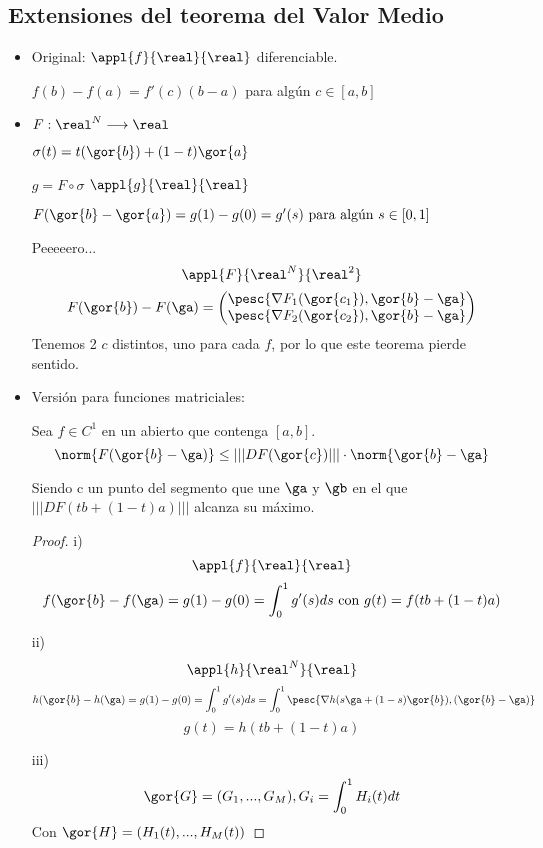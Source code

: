 \subsection{Extensiones del teorema del Valor Medio}
\begin{itemize}
 \item Original:
 $\appl{f}{\real}{\real}$ diferenciable. 
 
 $f(b)-f(a) = f'(c)(b-a)$ para algún $c\in[a,b]$
 
 \item
  
 $F : \real^N  \longrightarrow \real$
 
 $\sigma(t)  = t(\gor{b})+(1-t)\gor{a}$
 
 $g  = F\circ \sigma$
 $\appl{g}{\real }{\real}$
 
 $F(\gor{b}-\gor{a}) = g(1)-g(0)  = g'(s) \text{ para algún }s\in[0,1]$
 
  
  Peeeeero...
  $$\appl{F}{\real^N}{\real^2}$$
  $$F(\gor{b})-F(\ga) = \begin{pmatrix}
                         \pesc{\nabla F_1(\gor{c_1}),{\gor{b}-\ga}}\\
                         \pesc{\nabla F_2(\gor{c_2}),\gor{b}-\ga}
                        \end{pmatrix}
$$
  Tenemos 2 $c$ distintos, uno para cada $f$, por lo que este teorema pierde sentido.
  
  \item Versión para funciones matriciales:
  
  \begin{theorem} 
  Sea $f \in C^1$ en un abierto que contenga $[a,b]$.
  $$\norm{F(\gor{b}-\ga)} \leq |||DF(\gor{c})|||\cdot\norm{\gor{b}-\ga}$$ 
  
  Siendo c un punto del segmento que une $\ga$ y $\gb$ en el que $|||DF(tb+(1-t)a)|||$ alcanza su máximo.
   
  \end{theorem}

  
  
  \begin{proof}
   i) $$\appl{f}{\real}{\real}$$
   $$f(\gor{b}-f(\ga) = g(1)-g(0) = \int_0^1g'(s)ds \text{ con } g(t) = f(tb+(1-t)a)$$
   
   ii)  $$\appl{h}{\real^N}{\real}$$
   $$h(\gor{b}-h(\ga) = g(1)-g(0) = \int_0^1g'(s)ds = \int_0^1 \pesc{\nabla h(s\ga+(1-s)\gor{b}),(\gor{b}-\ga)}$$
   $$g(t) = h(tb+(1-t)a)$$
   
   iii) $$\gor{G} = (G_1,...,G_M), G_i = \int_0^1H_i(t)dt$$
   Con $\gor{H} = (H_1(t),...,H_M(t))$
   

\end{proof}
\end{itemize}
